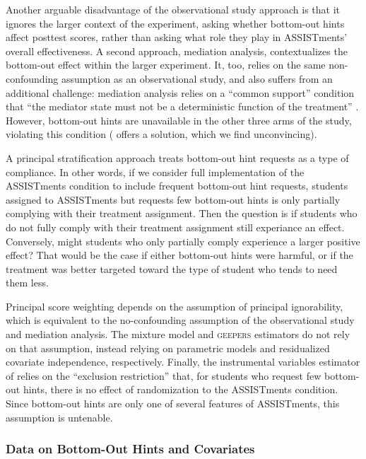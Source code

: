 \documentclass[]{article}
\begin{document}
Another arguable disadvantage of the observational study approach is that it ignores the larger context of the experiment, asking whether bottom-out hints affect posttest scores, rather than asking what role they play in ASSISTments' overall effectiveness.
A second approach, mediation analysis, contextualizes the bottom-out effect within the larger experiment.
It, too, relies on the same non-confounding assumption as an observational study, and also suffers from an additional challenge: mediation analysis relies on a ``common support'' condition that ``the mediator state must not be a deterministic function of the treatment'' \citep[p. 225]{celli2022causal}.
However, bottom-out hints are unavailable in the other three arms of the study, violating this condition (\citealt{sales2021student} offers a solution, which we find unconvincing).

A principal stratification approach treats bottom-out hint requests as a type of compliance.
In other words, if we consider full implementation of the ASSISTments condition to include frequent bottom-out hint requests, students assigned to ASSISTments but requests few bottom-out hints is only partially complying with their treatment assignment.
Then the question is if students who do not fully comply with their treatment assignment still experiance an effect.
Conversely, might students who only partially comply experience a larger positive effect?
That would be the case if either bottom-out hints were harmful, or if the treatment was better targeted toward the type of student who tends to need them less.

Principal score weighting depends on the assumption of principal ignorability, which is equivalent to the no-confounding assumption of the observational study and mediation analysis.
The mixture model and \textsc{geepers} estimators do not rely on that assumption, instead relying on parametric models and residualized covariate independence, respectively.
Finally, the instrumental variables estimator of \citet{air} relies on the ``exclusion restriction'' that, for students who request few bottom-out hints, there is no effect of randomization to the ASSISTments condition.
Since bottom-out hints are only one of several features of ASSISTments, this assumption is untenable. 


\subsubsection{Data on Bottom-Out Hints and Covariates}
\end{document}

